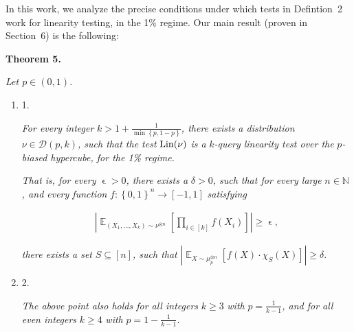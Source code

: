 In this work, we analyze the precise conditions under which tests in Defintion 2 work for linearity testing, in the 1\% regime.
Our main result (proven in Section 6) is the following:\par





\par\medskip\noindent\textbf{
\textbf{Theorem 5}\textbf{.}
}\par



\emph{Let $p\in(0,1)$.}\par


\begin{enumerate}


\item[] 
1. 


\emph{For every integer }$k>1+\frac{1}{\min\left\{p,1-p\right\}}$\emph{, there exists a distribution }$\nu\in\mathcal{D}(p,k)$\emph{, such that the test }$\textnormal{Lin}(\nu)$\emph{ is a }$k$\emph{-query linearity test over the }$p$\emph{-biased hypercube, for the 1\% regime.}\par




\emph{That is, for every }$\mathop{\epsilon}>0$\emph{, there exists a }$\delta>0$\emph{, such that for every large }$n\in\mathbb{N}$\emph{, and every function }$f:\left\{0,1\right\}^{n}\to[-1,1]$\emph{ satisfying}\par


\[\begin{gathered}
\left|\mathop{\mathbb{E}}_{(X_{1},\dots,X_{k})\sim\nu^{\otimes n}}\left[\prod_{i\in[k]}f(X_{i})\right]\right|\geqslant\mathop{\epsilon},
\end{gathered}\]


\emph{there exists a set }$S\subseteq[n]$\emph{, such that }$\left|\mathop{\mathbb{E}}_{X\sim\mu_{p}^{\otimes n}}\left[f(X)\cdot\chi_{S}(X)\right]\right|\geqslant\delta.$\emph{}\par





\item[] 
2. 


\emph{The above point also holds for all integers }$k\geqslant 3$\emph{ with }$p=\frac{1}{k-1}$\emph{, and for all even integers }$k\geqslant 4$\emph{ with }$p=1-\frac{1}{k-1}$\emph{.}\par






\end{enumerate}
